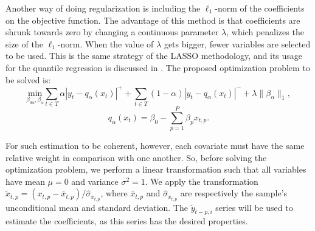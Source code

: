 Another way of doing regularization is including the $\ell_1$-norm of the coefficients on the objective function. The advantage of this method is that coefficients are shrunk towards zero by changing a continuous parameter $\lambda$, which penalizes the size of the $\ell_1$-norm.  
When the value of $\lambda$ gets bigger, fewer variables are selected to be used. 
This is the same strategy of the LASSO methodology, and its usage for the quantile regression is discussed in \cite{li2012l1}.
The proposed optimization problem to be solved is:
\begin{equation}
\underset{\beta_{0\alpha},\beta_\alpha}{\text{min}} \sum_{t \in T}\alpha|y_{t}-q_\alpha(x_t)|^{+}+ \sum_{t \in T}(1-\alpha)|y_{t}-q_\alpha(x_t)|^{-}+\lambda\|\beta_\alpha\|_{1},
\label{eq:l1-qar-optim}
\end{equation}
\[
q_\alpha(x_t)=\beta_{0}-\sum_{p=1}^{P}\beta_{p}x_{t,p}.
\]

For such estimation to be coherent, however, each covariate must have the same relative weight in comparison with one another. 
So, before solving the optimization problem, we perform a linear transformation such that all variables have mean $\mu = 0$ and variance $\sigma^2 = 1$. 
We apply the transformation $\tilde{x}_{t,p} = (x_{t,p} - \bar{x}_{t,p}) / \hat\sigma_{x_{t,p}}$, where $\bar{x}_{t,p}$ and $\hat{\sigma}_{x_{t,p}}$ are respectively the sample's unconditional mean and standard deviation. The $\tilde{y}_{t-p,i}$ series will be used to estimate the coefficients, as this series has the desired properties. 

